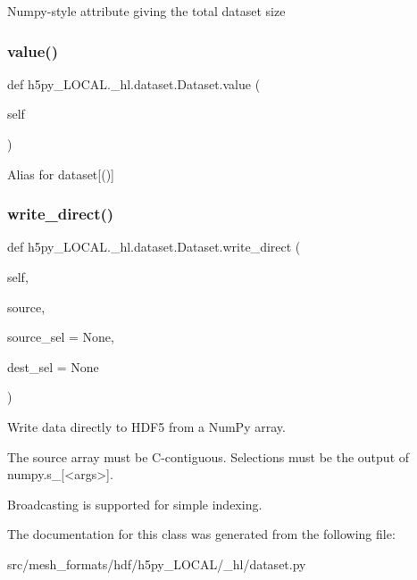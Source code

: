 \begin{DoxyVerb}Numpy-style attribute giving the total dataset size\end{DoxyVerb}
 \mbox{\label{classh5py__LOCAL_1_1__hl_1_1dataset_1_1Dataset_a482c0a49e79c0f6dd7a4359ba5be0d07}} 
\subsubsection{\texorpdfstring{value()}{value()}}
{\footnotesize\ttfamily def h5py\+\_\+\+L\+O\+C\+A\+L.\+\_\+hl.\+dataset.\+Dataset.\+value (\begin{DoxyParamCaption}\item[{}]{self }\end{DoxyParamCaption})}

\begin{DoxyVerb}Alias for dataset[()] \end{DoxyVerb}
 \mbox{\label{classh5py__LOCAL_1_1__hl_1_1dataset_1_1Dataset_ae7495d283ad12e1512df702ea8f9dc83}} 
\subsubsection{\texorpdfstring{write\+\_\+direct()}{write\_direct()}}
{\footnotesize\ttfamily def h5py\+\_\+\+L\+O\+C\+A\+L.\+\_\+hl.\+dataset.\+Dataset.\+write\+\_\+direct (\begin{DoxyParamCaption}\item[{}]{self,  }\item[{}]{source,  }\item[{}]{source\+\_\+sel = {\ttfamily None},  }\item[{}]{dest\+\_\+sel = {\ttfamily None} }\end{DoxyParamCaption})}

\begin{DoxyVerb}Write data directly to HDF5 from a NumPy array.

The source array must be C-contiguous.  Selections must be
the output of numpy.s_[<args>].

Broadcasting is supported for simple indexing.
\end{DoxyVerb}
 

The documentation for this class was generated from the following file\+:\begin{DoxyCompactItemize}
\item 
src/mesh\+\_\+formats/hdf/h5py\+\_\+\+L\+O\+C\+A\+L/\+\_\+hl/dataset.\+py\end{DoxyCompactItemize}
